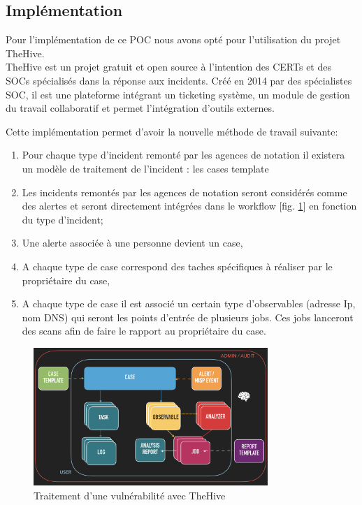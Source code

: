 \documentclass[a4paper,12pt]{book}
\theoremstyle{break}
\begin{document}
\subsection{Implémentation}
Pour l'implémentation de ce POC nous avons opté pour l'utilisation du projet TheHive.\\ TheHive est un projet gratuit et open source à l'intention des CERTs et des \ac{SOCs} spécialisés dans la réponse aux incidents. Créé en 2014 par des spécialistes SOC, il est une plateforme intégrant un ticketing système, un module de gestion du travail collaboratif et permet l'intégration d'outils externes. 


Cette implémentation permet d'avoir la nouvelle méthode de travail suivante: 
\begin{enumerate}
    \item Pour chaque type d'incident remonté par les agences de notation il existera un modèle de traitement de l'incident : les cases template
    \item Les incidents remontés par les agences de notation seront considérés comme des alertes et seront directement intégrées dans le workflow [fig. \ref{fig:workflow}] en fonction du type d'incident;
    \item Une alerte associée à une personne devient un case, 
    \item A chaque type de case correspond des taches spécifiques à réaliser par le propriétaire du case, 
    \item A chaque type de case il est associé un certain type d'observables (adresse Ip, nom DNS) qui seront les points d'entrée de plusieurs jobs. Ces jobs lanceront des scans afin de faire le rapport au propriétaire du case. 
    
\end{enumerate} 

\begin{figure}[h!]
    \centering
    \includegraphics[width=0.79\textwidth]{thehive-workflow.png}
    \caption{Traitement d'une vulnérabilité avec TheHive}
    \label{fig:workflow}
\end{figure}
\end{document}
